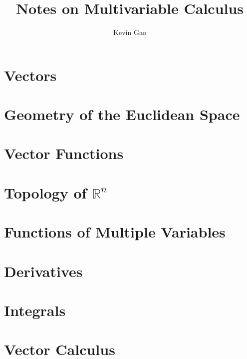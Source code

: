 \documentclass[11pt]{book}
\def\R {{\mathbb R}}
\begin{document}
\title{Notes on Multivariable Calculus}
\author{Kevin Gao}
\maketitle

\chapter{Vectors}



\chapter{Geometry of the Euclidean Space}



\chapter{Vector Functions}



\chapter{Topology of $\R^n$}



\chapter{Functions of Multiple Variables}



\chapter{Derivatives}



\chapter{Integrals}



\chapter{Vector Calculus}


\end{document}
